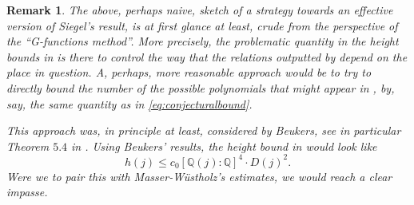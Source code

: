 \documentclass[12pt,twoside,a4paper]{article}
\theoremstyle{plain}%
\newtheorem{remark}[theorem]{Remark}
\newcommand{\Q}{\mathbb{Q}}
\begin{document}
\begin{remark}The above, perhaps naive, sketch of a strategy towards an effective version of Siegel's result, is at first glance at least, crude from the perspective of the ``G-functions method''. More precisely, the problematic quantity in the height bounds in  is there to control the way that the relations outputted by  depend on the place in question. A, perhaps, more reasonable approach would be to try to directly bound the number of the possible polynomials that might appear in , by, say, the same quantity as in \eqref{eq:conjecturalbound}.

This approach was, in principle at least, considered by Beukers, see in particular Theorem $5.4$ in \cite{beukers}. Using Beukers' results, the height bound in  would look like \begin{equation}\label{eq:badheightbound}
	h(j)\leq c_0 [\Q(j):\Q]^4\cdot D(j)^2.
\end{equation}Were we to pair this with Masser-W\"ustholz's estimates, we would reach a clear impasse. \end{remark}

\appendix	



\end{document}
